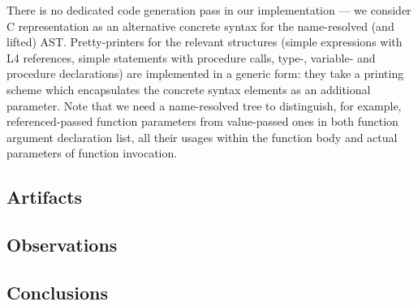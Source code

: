 There is no dedicated code generation pass in our implementation --- we consider C representation
as an alternative concrete syntax for the name-resolved (and lifted) AST. Pretty-printers for the relevant
structures (simple expressions with L4 references, simple statements with procedure calls, 
type-, variable- and procedure declarations) are implemented in a generic form: they take a
printing scheme which encapsulates the concrete syntax elements as an additional
parameter. Note that we need a name-resolved tree to distinguish, for example, referenced-passed
function parameters from value-passed ones in both function argument declaration list, all
their usages within the function body and actual parameters of function invocation.

\subsection{Artifacts}

\subsection{Observations}

\subsection{Conclusions}
